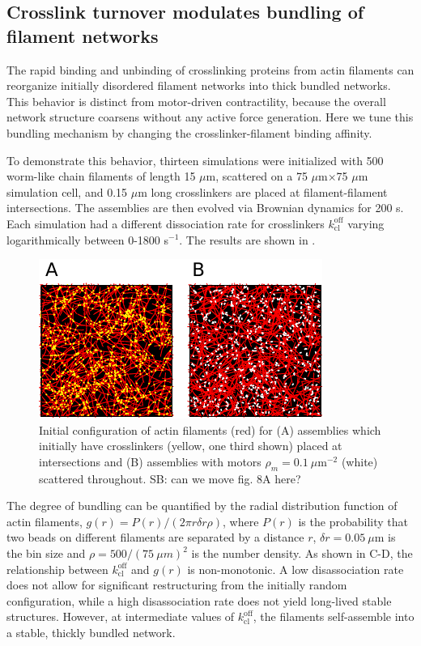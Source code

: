 \documentclass[11pt]{article}
\begin{document}
\subsection*{Crosslink turnover modulates bundling of filament networks}
The rapid binding and unbinding of crosslinking proteins from actin
filaments can reorganize initially disordered filament {\color{red}networks} into thick bundled networks. 
This behavior is distinct from motor-driven contractility, because the overall network structure {\color{red}coarsens} without
{\color{red}any active force generation}. {\color{red}Here} we tune this bundling mechanism by
changing the crosslinker-filament binding affinity. 
\par
To demonstrate this behavior, thirteen simulations were initialized with 500 worm-like chain filaments of length 15 $\mu$m, scattered 
on a 75 $\mu$m$\times$75 $\mu$m simulation cell, and 0.15 $\mu$m long crosslinkers {\color{red}are placed} at filament-filament intersections. 
The assemblies {\color{red}are} then evolved via Brownian dynamics for 200 s.   
Each simulation had a different dissociation rate for crosslinkers $k^\text{off}_\text{cl}$ varying
logarithmically between 0-1800 s$^{-1}$. The results are shown in . 
\par
\begin{figure}
  \centering
  \includegraphics[width=0.6\columnwidth]{figs/t0.pdf}
  \caption{\label{fig:t0}Initial configuration of actin filaments (red) for 
  (A) assemblies which initially have crosslinkers (yellow, one third shown) placed at intersections and 
  (B) assemblies with motors $\rho_m=0.1\ \mu$m$^{-2}$ (white) scattered throughout. {\color{blue}SB: can we move fig. 8A here?}}
\end{figure}
The {\color{red}degree} of bundling {\color{red}can be quantified} by the radial
distribution function of actin filaments, $g(r) = P(r)/(2\pi r \delta r\rho)$, where $P(r)$ is the probability that two beads on different filaments are {\color{red}separated by} a distance $r$, $\delta r =0.05\ \mu$m is the bin size and $\rho = 500/(75\ \mu m)^2$ is the number density. As {\color{red}shown} in C-D, the relationship between $k^\text{off}_\text{cl}$ and $g(r)$ is non-monotonic. A {\color{red}low} disassociation rate {\color{red}does} not allow for significant restructuring from the initially random configuration, {\color{red}while} a {\color{red}high} disassociation rate {\color{red}does} not yield {\color{red}long-lived} stable structures. However, at intermediate values of $k^\text{off}_\text{cl}$, {\color{red}the filaments self-assemble into} a stable, thickly bundled network.
\end{document}
